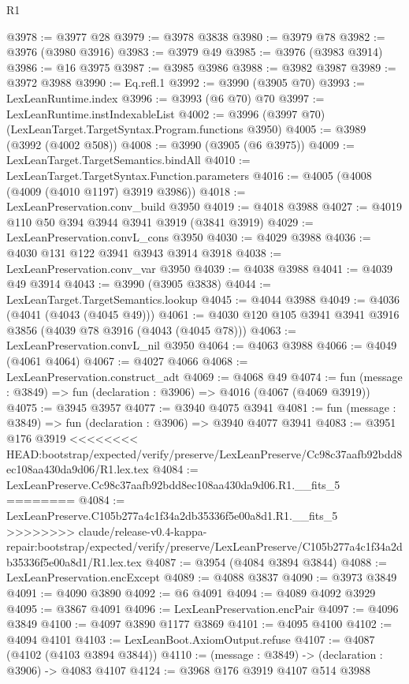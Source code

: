 \begin{lexlean}{R1}
\begin{coremodule}
{{{{{{{{{{{{{{{{{{{{{{{{{{{{{{{{{{{{{{{{{{{{{{{{{{{{{{{{{{{{{{{{{{{{{{{{{{{{{{{{{{{{{{{{{{{{{{{{{{{{{{{{{{{{{{{{{{{{{{{{{{{{{{{{{{{{{{{{{{{{{{{{{{{{{{{{{{{{{{{{{{{{{{{{{{{{{{{{{{{{{{{{{{@3978 := @3977 @28
@3979 := @3978 @3838
@3980 := @3979 @78
@3982 := @3976 (@3980 @3916)
@3983 := @3979 @49
@3985 := @3976 (@3983 @3914)
@3986 := @16 @3975
@3987 := @3985 @3986
@3988 := @3982 @3987
@3989 := @3972 @3988
@3990 := Eq.refl.{1}
@3992 := @3990 (@3905 @70)
@3993 := LexLeanRuntime.index
@3996 := @3993 (@6 @70) @70
@3997 := LexLeanRuntime.instIndexableList
@4002 := @3996 (@3997 @70) (LexLeanTarget.TargetSyntax.Program.functions @3950)
@4005 := @3989 (@3992 (@4002 @508))
@4008 := @3990 (@3905 (@6 @3975))
@4009 := LexLeanTarget.TargetSemantics.bindAll
@4010 := LexLeanTarget.TargetSyntax.Function.parameters
@4016 := @4005 (@4008 (@4009 (@4010 @1197) @3919 @3986))
@4018 := LexLeanPreservation.conv_build @3950
@4019 := @4018 @3988
@4027 := @4019 @110 @50 @394 @3944 @3941 @3919 (@3841 @3919)
@4029 := LexLeanPreservation.convL_cons @3950
@4030 := @4029 @3988
@4036 := @4030 @131 @122 @3941 @3943 @3914 @3918
@4038 := LexLeanPreservation.conv_var @3950
@4039 := @4038 @3988
@4041 := @4039 @49 @3914
@4043 := @3990 (@3905 @3838)
@4044 := LexLeanTarget.TargetSemantics.lookup
@4045 := @4044 @3988
@4049 := @4036 (@4041 (@4043 (@4045 @49)))
@4061 := @4030 @120 @105 @3941 @3941 @3916 @3856 (@4039 @78 @3916 (@4043 (@4045 @78)))
@4063 := LexLeanPreservation.convL_nil @3950
@4064 := @4063 @3988
@4066 := @4049 (@4061 @4064)
@4067 := @4027 @4066
@4068 := LexLeanPreservation.construct_adt
@4069 := @4068 @49
@4074 := fun (message : @3849) => fun (declaration : @3906) => @4016 (@4067 (@4069 @3919))
@4075 := @3945 @3957
@4077 := @3940 @4075 @3941
@4081 := fun (message : @3849) => fun (declaration : @3906) => @3940 @4077 @3941
@4083 := @3951 @176 @3919
<<<<<<<< HEAD:bootstrap/expected/verify/preserve/LexLeanPreserve/Cc98c37aafb92bdd8ec108aa430da9d06/R1.lex.tex
@4084 := LexLeanPreserve.Cc98c37aafb92bdd8ec108aa430da9d06.R1.__fits_5
========
@4084 := LexLeanPreserve.C105b277a4c1f34a2db35336f5e00a8d1.R1.__fits_5
>>>>>>>> claude/release-v0.4-kappa-repair:bootstrap/expected/verify/preserve/LexLeanPreserve/C105b277a4c1f34a2db35336f5e00a8d1/R1.lex.tex
@4087 := @3954 (@4084 @3894 @3844)
@4088 := LexLeanPreservation.encExcept
@4089 := @4088 @3837
@4090 := @3973 @3849
@4091 := @4090 @3890
@4092 := @6 @4091
@4094 := @4089 @4092 @3929
@4095 := @3867 @4091
@4096 := LexLeanPreservation.encPair
@4097 := @4096 @3849
@4100 := @4097 @3890 @1177 @3869
@4101 := @4095 @4100
@4102 := @4094 @4101
@4103 := LexLeanBoot.AxiomOutput.refuse
@4107 := @4087 (@4102 (@4103 @3894 @3844))
@4110 := (message : @3849) -> (declaration : @3906) -> @4083 @4107
@4124 := @3968
    @176
    @3919
    @4107
    @514
    @3988
}}}}}}}}}}}}}}}}}}}}}}}}}}}}}}}}}}}}}}}}}}}}}}}}}}}}}}}}}}}}}}}}}}}}}}}}}}}}}}}}}}}}}}}}}}}}}}}}}}}}}}}}}}}}}}}}}}}}}}}}}}}}}}}}}}}}}}}}}}}}}}}}}}}}}}}}}}}}}}}}}}}}}}}}}}}}}}}}}}}}}}}}}}
\end{coremodule}
\end{lexlean}
